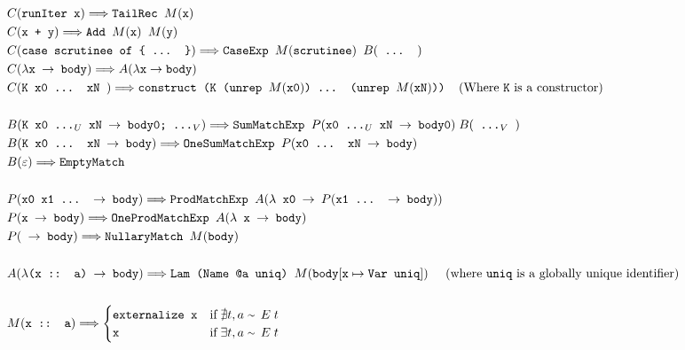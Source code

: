 \documentclass[sigplan,anonymous,review]{acmart}
\newcommand{\expr}[1]{(#1)} %
\newcommand{\rarr}{\rightarrow}
\newcommand{\rewrites}{\Longrightarrow}
\newcommand{\typeeq}{\raise.17ex\hbox{$\scriptstyle\mathtt{\sim}$}\,\;}
\newcommand{\ttt}{\texttt}
\begin{document}
\begin{align*}
  &C\expr{\ttt{runIter x}} \rewrites \ttt{TailRec $M\expr{\ttt{x}}$}\\
  &C\expr{\ttt{x + y}} \rewrites \ttt{Add $M\expr{\ttt{x}}$ $M\expr{\ttt{y}}$}\\
  &C\expr{\ttt{case scrutinee of \{ ... \}}} \rewrites \ttt{CaseExp $M\expr{\ttt{scrutinee}}$ } B\expr{\ttt{ ... }}\\
  &C\expr{\ttt{$\lambda$x $\rarr$ body}} \rewrites A\expr{\lambda \ttt{x} \rarr \ttt{body}}\\
  &C\expr{\ttt{K x0 ... xN }} \rewrites \ttt{construct (K (unrep $M\expr{\ttt{x0}}$) ... (unrep $M\expr{\ttt{xN}}$))}\;\;\;\;\text{(Where \ttt{K} is a constructor)}\\
  &\\
  &B\expr{\ttt{K x0 ...$_U$ xN $\rarr$ body0; ...$_V$}} \rewrites \ttt{SumMatchExp }P\expr{\ttt{x0 ...$_U$ xN $\rarr$ body0}}\; B\expr{\ttt{ ...$_V$ }}\\
  &B\expr{\ttt{K x0 ... xN $\rarr$ body}} \rewrites \ttt{OneSumMatchExp }P\expr{\ttt{x0 ... xN $\rarr$ body}}\\
  &B\expr{\ttt{$\varepsilon$}} \rewrites \ttt{EmptyMatch}\\
  &\\
  &P\expr{\ttt{x0 x1 ... $\rarr$ body}} \rewrites \ttt{ProdMatchExp }A\expr{\ttt{$\lambda$ x0 $\rarr$ $P\expr{\ttt{x1 ... $\rarr$ body}}$}}\\
  &P\expr{\ttt{x $\rarr$ body}} \rewrites \ttt{OneProdMatchExp }A\expr{\ttt{$\lambda$ x $\rarr$ body}}\\
  &P\expr{\ttt{ $\rarr$ body}} \rewrites \ttt{NullaryMatch $M\expr{\ttt{body}}$}\\
  &\\
  &A\expr{\ttt{$\lambda$(x :: a) $\rarr$ body}} \rewrites \ttt{Lam (Name @a uniq) $M\expr{\ttt{body$[\ttt{x} \mapsto \ttt{Var uniq}]$}}$}\text{\;\;\;\;\;(where \ttt{uniq} is a globally unique identifier)}\\
  &\\
  &M\expr{\ttt{x :: a}} \rewrites
    \begin{cases}
      \ttt{externalize x} & \text{if}\; \nexists t, a\; \typeeq E\; t\\
      \ttt{x} & \text{if}\; \exists t, a\; \typeeq E\; t
    \end{cases}
\end{align*}
\end{document}
